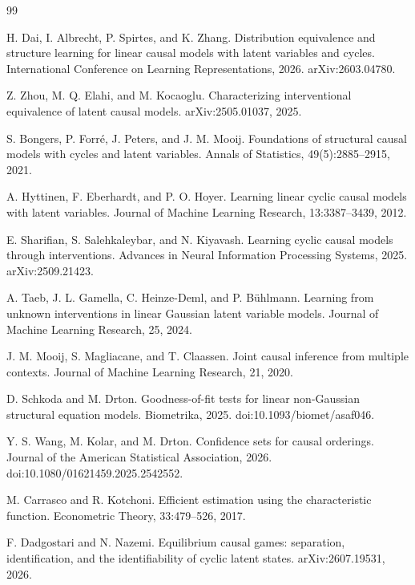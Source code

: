 \documentclass{article}
\begin{document}
\begin{thebibliography}{99}

   H. Dai, I. Albrecht, P. Spirtes, and K. Zhang. Distribution equivalence and structure learning for linear causal models with latent variables and cycles. International Conference on Learning Representations, 2026. arXiv:2603.04780.

   Z. Zhou, M. Q. Elahi, and M. Kocaoglu. Characterizing interventional equivalence of latent causal models. arXiv:2505.01037, 2025.

   S. Bongers, P. Forré, J. Peters, and J. M. Mooij. Foundations of structural causal models with cycles and latent variables. Annals of Statistics, 49(5):2885--2915, 2021.

   A. Hyttinen, F. Eberhardt, and P. O. Hoyer. Learning linear cyclic causal models with latent variables. Journal of Machine Learning Research, 13:3387--3439, 2012.

   E. Sharifian, S. Salehkaleybar, and N. Kiyavash. Learning cyclic causal models through interventions. Advances in Neural Information Processing Systems, 2025. arXiv:2509.21423.

   A. Taeb, J. L. Gamella, C. Heinze-Deml, and P. Bühlmann. Learning from unknown interventions in linear Gaussian latent variable models. Journal of Machine Learning Research, 25, 2024.

   J. M. Mooij, S. Magliacane, and T. Claassen. Joint causal inference from multiple contexts. Journal of Machine Learning Research, 21, 2020.

   D. Schkoda and M. Drton. Goodness-of-fit tests for linear non-Gaussian structural equation models. Biometrika, 2025. doi:10.1093/biomet/asaf046.

   Y. S. Wang, M. Kolar, and M. Drton. Confidence sets for causal orderings. Journal of the American Statistical Association, 2026. doi:10.1080/01621459.2025.2542552.

   M. Carrasco and R. Kotchoni. Efficient estimation using the characteristic function. Econometric Theory, 33:479--526, 2017.

   F. Dadgostari and N. Nazemi. Equilibrium causal games: separation, identification, and the identifiability of cyclic latent states. arXiv:2607.19531, 2026.


\end{thebibliography}
\end{document}
